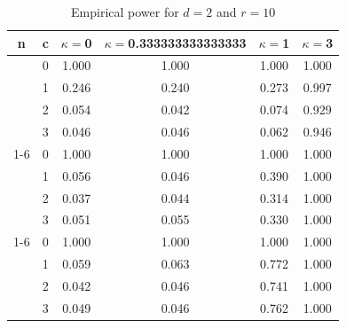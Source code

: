 \documentclass[oneside,11pt]{article}
\begin{document}
\begin{table}[H]
\centering
\caption{Empirical power for $d = 2$ and $r = 10$}
\centering
\begin{tabular}[t]{cccccc}
\toprule
n & c & $\kappa = $0 & $\kappa = $0.333333333333333 & $\kappa = $1 & $\kappa = $3\\
\midrule
 & 0 & 1.000 & 1.000 & 1.000 & 1.000\\

 & 1 & 0.246 & 0.240 & 0.273 & 0.997\\

 & 2 & 0.054 & 0.042 & 0.074 & 0.929\\

\multirow{-4}{*}{\centering\arraybackslash 10} & 3 & 0.046 & 0.046 & 0.062 & 0.946\\
\cmidrule{1-6}
 & 0 & 1.000 & 1.000 & 1.000 & 1.000\\

 & 1 & 0.056 & 0.046 & 0.390 & 1.000\\

 & 2 & 0.037 & 0.044 & 0.314 & 1.000\\

\multirow{-4}{*}{\centering\arraybackslash 50} & 3 & 0.051 & 0.055 & 0.330 & 1.000\\
\cmidrule{1-6}
 & 0 & 1.000 & 1.000 & 1.000 & 1.000\\

 & 1 & 0.059 & 0.063 & 0.772 & 1.000\\

 & 2 & 0.042 & 0.046 & 0.741 & 1.000\\

\multirow{-4}{*}{\centering\arraybackslash 100} & 3 & 0.049 & 0.046 & 0.762 & 1.000\\
\bottomrule
\end{tabular}
\end{table}
\end{document}
